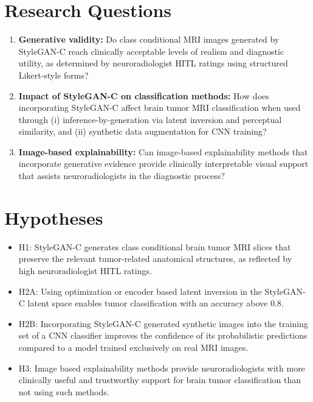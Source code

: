 \section{Research Questions}
\begin{enumerate}
    \item \textbf{Generative validity:} 
       Do class conditional MRI images generated by StyleGAN-C reach clinically acceptable levels of realism and diagnostic utility, as determined by neuroradiologist HITL ratings using structured Likert-style forms?


    \item \textbf{Impact of StyleGAN-C on classification methods:} 
    How does incorporating StyleGAN-C affect brain tumor MRI classification when used through 
    (i) inference-by-generation via latent inversion and perceptual similarity, and 
    (ii) synthetic data augmentation for CNN training?

    \item \textbf{Image-based explainability:} 
    Can image-based explainability methods that incorporate generative evidence provide clinically interpretable visual support that assists neuroradiologists in the diagnostic process? 

\end{enumerate}

\section{Hypotheses}




\begin{itemize}
    \item H1: StyleGAN-C generates class conditional brain tumor MRI slices that preserve the relevant tumor-related anatomical structures, as reflected by high neuroradiologist HITL ratings.

    
    \item H2A: Using optimization or encoder based latent inversion in the StyleGAN-C latent space enables tumor classification with an accuracy above 0.8.

    
    \item H2B: Incorporating StyleGAN-C generated synthetic images into the training set of a CNN classifier improves the confidence of its probabilistic predictions compared to a model trained exclusively on real MRI images.
    
    
    \item H3: Image based explainability methods provide neuroradiologists with more clinically useful and trustworthy support for brain tumor classification than not using such methods.

\end{itemize}

